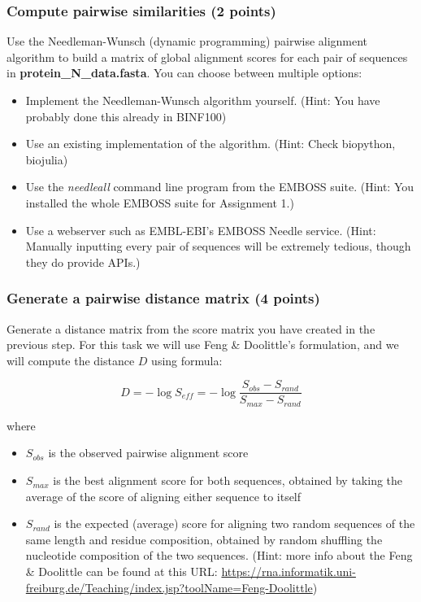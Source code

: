 \documentclass[
  a4paper,
  DIV=11,
  numbers=noendperiod]{scrartcl}
\providecommand{\tightlist}{%
  \setlength{\itemsep}{0pt}\setlength{\parskip}{0pt}}\usepackage{longtable,booktabs,array}
\begin{document}
\hypertarget{compute-pairwise-similarities-2-points}{%
\subsubsection{Compute pairwise similarities (2
points)}\label{compute-pairwise-similarities-2-points}}

Use the Needleman-Wunsch (dynamic programming) pairwise alignment
algorithm to build a matrix of global alignment scores for each pair of
sequences in \textbf{protein\_N\_data.fasta}. You can choose between
multiple options:

\begin{itemize}
\tightlist
\item
  Implement the Needleman-Wunsch algorithm yourself. (Hint: You have
  probably done this already in BINF100)
\item
  Use an existing implementation of the algorithm. (Hint: Check
  biopython, biojulia)
\item
  Use the \emph{needleall} command line program from the EMBOSS suite.
  (Hint: You installed the whole EMBOSS suite for Assignment 1.)
\item
  Use a webserver such as EMBL-EBI's EMBOSS Needle service. (Hint:
  Manually inputting every pair of sequences will be extremely tedious,
  though they do provide APIs.)
\end{itemize}

\hypertarget{generate-a-pairwise-distance-matrix-4-points}{%
\subsubsection{Generate a pairwise distance matrix (4
points)}\label{generate-a-pairwise-distance-matrix-4-points}}

Generate a distance matrix from the score matrix you have created in the
previous step. For this task we will use Feng \& Doolittle's
formulation, and we will compute the distance \(D\) using formula:

\[
D = -\log S_{eff} = -\log \frac{S_{obs}-S_{rand}}{S_{max} - S_{rand}}
\]

where

\begin{itemize}
\tightlist
\item
  \(S_{obs}\) is the observed pairwise alignment score
\item
  \(S_{max}\) is the best alignment score for both sequences, obtained
  by taking the average of the score of aligning either sequence to
  itself
\item
  \(S_{rand}\) is the expected (average) score for aligning two random
  sequences of the same length and residue composition, obtained by
  random shuffling the nucleotide composition of the two sequences.
  (Hint: more info about the Feng \& Doolittle can be found at this URL:
  \url{https://rna.informatik.uni-freiburg.de/Teaching/index.jsp?toolName=Feng-Doolittle})
\end{itemize}
\end{document}
